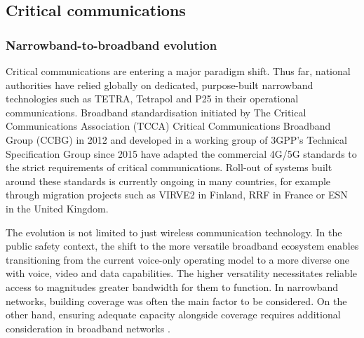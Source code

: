 \documentclass[english, 12pt, a4paper, elec, utf8, a-1b, online]{aaltothesis}
\begin{document}




\clearpage

\subsection{Critical communications}
\subsubsection{Narrowband-to-broadband evolution}
Critical communications are entering a major paradigm shift. Thus far, national authorities have relied globally on dedicated, purpose-built narrowband technologies such as TETRA, Tetrapol and P25 in their operational communications. Broadband standardisation initiated by The Critical Communications Association (TCCA) Critical Communications Broadband Group (CCBG) in 2012 and developed in a working group of 3GPP’s Technical Specification Group since 2015 have adapted the commercial 4G/5G standards to the strict requirements of critical communications. Roll-out of systems built around these standards is currently ongoing in many countries, for example through migration projects such as VIRVE2 in Finland, RRF in France or ESN in the United Kingdom.

The evolution is not limited to just wireless communication technology. In the public safety context, the shift to the more versatile broadband ecosystem enables transitioning from the current voice-only operating model to a more diverse one with voice, video and data capabilities. The higher versatility necessitates reliable access to magnitudes greater bandwidth for them to function. In narrowband networks, building coverage was often the main factor to be considered. On the other hand, ensuring adequate capacity alongside coverage requires additional consideration in broadband networks \cite{saynevirta2021satellite}.
\end{document}
